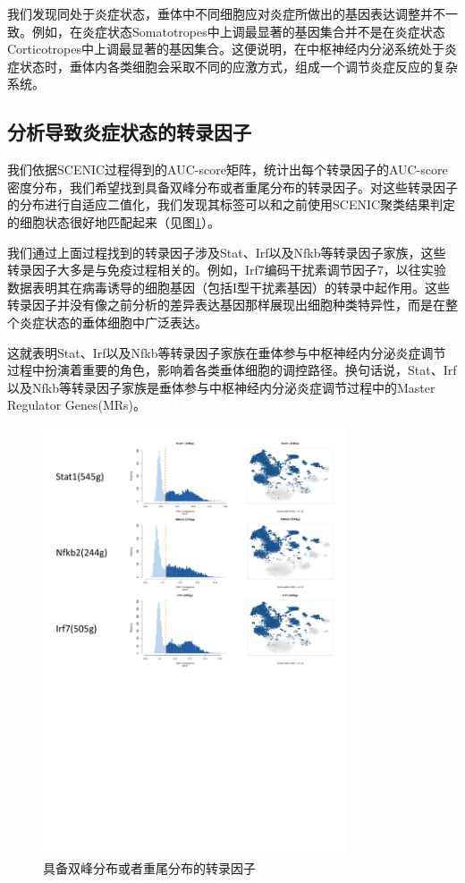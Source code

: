   我们发现同处于炎症状态，垂体中不同细胞应对炎症所做出的基因表达调整并不一致。例如，在炎症状态Somatotropes中上调最显著的基因集合并不是在炎症状态Corticotropes中上调最显著的基因集合。这便说明，在中枢神经内分泌系统处于炎症状态时，垂体内各类细胞会采取不同的应激方式，组成一个调节炎症反应的复杂系统。

\subsection{分析导致炎症状态的转录因子}
  我们依据SCENIC过程得到的AUC-score矩阵，统计出每个转录因子的AUC-score密度分布，我们希望找到具备双峰分布或者重尾分布的转录因子。对这些转录因子的分布进行自适应二值化，我们发现其标签可以和之前使用SCENIC聚类结果判定的细胞状态很好地匹配起来（见图\ref{fig:expr-fig3}）。

  我们通过上面过程找到的转录因子涉及Stat、Irf以及Nfkb等转录因子家族，这些转录因子大多是与免疫过程相关的。例如，Irf7编码干扰素调节因子7，以往实验数据表明其在病毒诱导的细胞基因（包括I型干扰素基因）的转录中起作用。这些转录因子并没有像之前分析的差异表达基因那样展现出细胞种类特异性，而是在整个炎症状态的垂体细胞中广泛表达。

  这就表明Stat、Irf以及Nfkb等转录因子家族在垂体参与中枢神经内分泌炎症调节过程中扮演着重要的角色，影响着各类垂体细胞的调控路径。换句话说，Stat、Irf以及Nfkb等转录因子家族是垂体参与中枢神经内分泌炎症调节过程中的Master Regulator Genes(MRs)\cite{mattick2010global}。

\begin{figure}[!htb]
  \centering
  \includegraphics[width=0.8\textwidth]{figs/expr-fig3.pdf}
  \caption{具备双峰分布或者重尾分布的转录因子}
  \label{fig:expr-fig3}
\end{figure}

